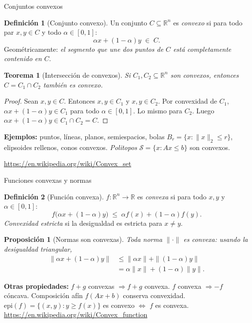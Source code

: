 \documentclass[10pt,aspectratio=169]{beamer}
\theoremstyle{definition}
\newtheorem{definicion}{Definición}
\theoremstyle{plain}
\newtheorem{teorema}{Teorema}
\newtheorem{prop}{Proposición}
\begin{document}
\begin{frame}[t]{Conjuntos convexos}
  \begin{definicion}[Conjunto convexo]
    Un conjunto $C\subseteq\mathbb{R}^{n}$ es \emph{convexo} si para todo
    par $x,y\in C$ y todo $\alpha\in[0,1]$:
    \[
      \alpha x + (1-\alpha)y \;\in\; C.
    \]
    Geométricamente: \emph{el segmento que une dos puntos de $C$ está
    completamente contenido en $C$}.
  \end{definicion}

  \vspace{0.2em}
  \begin{teorema}[Intersección de convexos]
    Si $C_{1},C_{2}\subseteq\mathbb{R}^{n}$ son convexos, entonces
    $C = C_{1}\cap C_{2}$ también es convexo.
  \end{teorema}

  \begin{proof}
    Sean $x,y\in C$. Entonces $x,y\in C_{1}$ y $x,y\in C_{2}$.
    Por convexidad de $C_{1}$, $\alpha x+(1-\alpha)y\in C_{1}$ para todo
    $\alpha\in[0,1]$. Lo mismo para $C_{2}$. Luego
    $\alpha x+(1-\alpha)y\in C_{1}\cap C_{2}=C$.
  \end{proof}

  \vspace{0.2em}
  \textbf{Ejemplos:} puntos, líneas, planos, semiespacios, bolas
  $B_{r}=\{x:\|x\|_{2}\leq r\}$, elipsoides rellenos, conos convexos.
  \emph{Politopos} $\mathcal{S}=\{x:Ax\leq b\}$ son convexos.

  \url{https://en.wikipedia.org/wiki/Convex_set}
\end{frame}

\begin{frame}[t]{Funciones convexas y normas}
  \begin{definicion}[Función convexa]
    $f:\mathbb{R}^{n}\to\mathbb{R}$ es \emph{convexa} si para todo
    $x,y$ y $\alpha\in[0,1]$:
    \[
      f\bigl(\alpha x+(1-\alpha)y\bigr) \;\leq\;
      \alpha f(x)+(1-\alpha)f(y).
    \]
    \emph{Convexidad estricta} si la desigualdad es estricta para $x\neq y$.
  \end{definicion}

  \vspace{0.2em}
  \begin{prop}[Normas son convexas]
    Toda norma $\|\cdot\|$ es convexa: usando la desigualdad triangular,
    \begin{align*}
      \|\alpha x + (1-\alpha)y\|
      &\leq \|\alpha x\| + \|(1-\alpha)y\| \\
      &= \alpha\|x\| + (1-\alpha)\|y\|.
    \end{align*}
  \end{prop}

  \vspace{0.2em}
  \textbf{Otras propiedades:} $f+g$ convexas $\Rightarrow f+g$ convexa.
  $f$ convexa $\Rightarrow -f$ cóncava. Composición afín $f(Ax+b)$ conserva
  convexidad. $\mathrm{epi}(f)=\{(x,y):y\geq f(x)\}$ es convexo
  $\Leftrightarrow$ $f$ es convexa.
  \url{https://en.wikipedia.org/wiki/Convex_function}

\end{frame}
\end{document}
